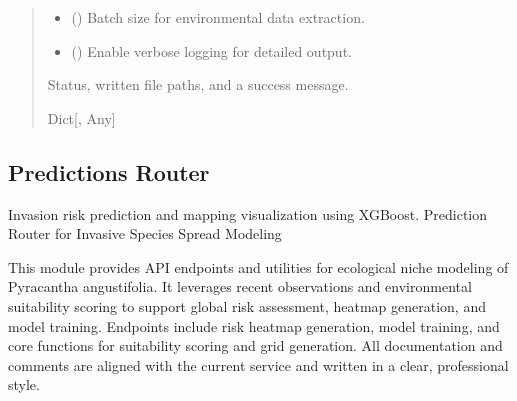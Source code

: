 \documentclass[letterpaper,10pt,english]{sphinxmanual}
\begin{document}
\begin{fulllineitems}
\begin{quote}
\begin{description}
\begin{itemize}
\item {} 
\sphinxAtStartPar
{} () \textendash{} Batch size for environmental data extraction.

\item {} 
\sphinxAtStartPar
{} () \textendash{} Enable verbose logging for detailed output.

\end{itemize}

\sphinxAtStartPar
Status, written file paths, and a success message.

\sphinxAtStartPar
Dict{[}, Any{]}

\end{description}\end{quote}

\end{fulllineitems}



\subsection{Predictions Router}
\label{\detokenize{api_reference:predictions-router}}
\sphinxAtStartPar
Invasion risk prediction and mapping visualization using XGBoost.
\label{\detokenize{api_reference:module-app.routers.predictions}}
\sphinxAtStartPar
Prediction Router for Invasive Species Spread Modeling

\sphinxAtStartPar
This module provides API endpoints and utilities for ecological niche modeling of
Pyracantha angustifolia. It leverages recent observations and environmental suitability
scoring to support global risk assessment, heatmap generation, and model training.
Endpoints include risk heatmap generation, model training, and core functions for suitability scoring and grid generation.
All documentation and comments are aligned with the current service and written in a clear, professional style.
\end{document}
